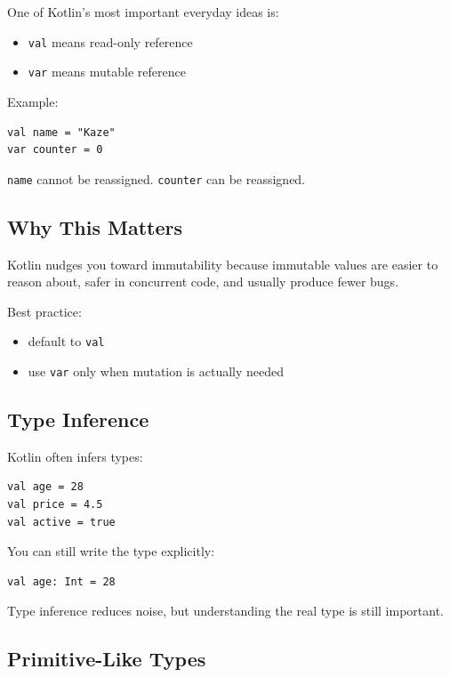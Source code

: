 \documentclass[11pt,a4paper]{article}
\begin{document}
One of Kotlin's most important everyday ideas is:
\begin{itemize}
    \item \texttt{val} means read-only reference
    \item \texttt{var} means mutable reference
\end{itemize}

Example:

\begin{lstlisting}[style=kazekotlin]
val name = "Kaze"
var counter = 0
\end{lstlisting}

\texttt{name} cannot be reassigned.
\texttt{counter} can be reassigned.

\subsection{Why This Matters}

Kotlin nudges you toward immutability because immutable values are easier to reason about, safer in concurrent code, and usually produce fewer bugs.

Best practice:
\begin{itemize}
    \item default to \texttt{val}
    \item use \texttt{var} only when mutation is actually needed
\end{itemize}

\subsection{Type Inference}

Kotlin often infers types:

\begin{lstlisting}[style=kazekotlin]
val age = 28
val price = 4.5
val active = true
\end{lstlisting}

You can still write the type explicitly:

\begin{lstlisting}[style=kazekotlin]
val age: Int = 28
\end{lstlisting}

Type inference reduces noise, but understanding the real type is still important.

\subsection{Primitive-Like Types}
\end{document}
